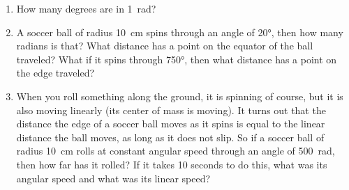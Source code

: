 \begin{enumerate}
%	
%	
%	
%	
%	
%	
	
	\item How many degrees are in \SI{1}{\radian}?
	
	\item A soccer ball of radius \SI{10}{cm} spins through an angle of \ang{20}, then how many radians is that? What distance has a point on the equator of the ball traveled? What if it spins through \ang{750}, then what distance has a point on the edge traveled?
	
	\bigskip
	\item When you roll something along the ground, it is spinning of course, but it is also moving linearly (its center of mass is moving). It turns out that the distance the edge of a soccer ball moves as it spins is equal to the linear distance the ball moves, as long as it does not slip. So if a soccer ball of radius \SI{10}{cm} rolls at constant angular speed through an angle of \SI{500}{\radian}, then how far has it rolled? If it takes 10 seconds to do this, what was its angular speed and what was its linear speed?
	\bigskip
	

\end{enumerate}
